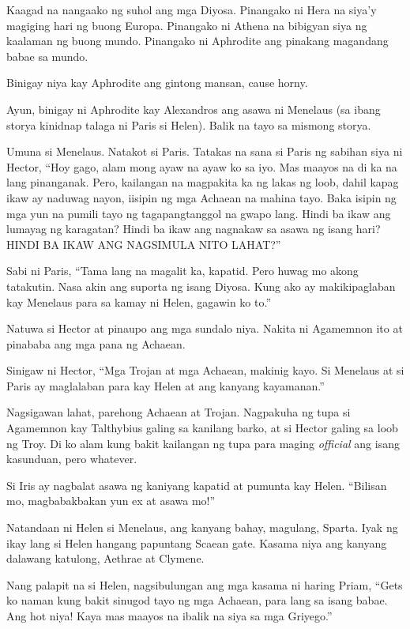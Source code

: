 \documentclass[12pt,letterpaper]{report}
\begin{document}
Kaagad na nangaako ng suhol ang mga Diyosa. Pinangako ni Hera na siya'y magiging hari ng buong Europa. Pinangako ni Athena na bibigyan siya ng kaalaman ng buong mundo. Pinangako ni Aphrodite ang pinakang magandang babae sa mundo.

Binigay niya kay Aphrodite ang gintong mansan, cause horny.

Ayun, binigay ni Aphrodite kay Alexandros ang asawa ni Menelaus (sa ibang storya kinidnap talaga ni Paris si Helen). Balik na tayo sa mismong storya.

Umuna si Menelaus. Natakot si Paris. Tatakas na sana si Paris ng sabihan siya ni Hector, ``Hoy gago, alam mong ayaw na ayaw ko sa iyo. Mas maayos na di ka na lang pinanganak. Pero, kailangan na magpakita ka ng lakas ng loob, dahil kapag ikaw ay naduwag nayon, iisipin ng mga Achaean na mahina tayo. Baka isipin ng mga yun na pumili tayo ng tagapangtanggol na gwapo lang. Hindi ba ikaw ang lumayag ng karagatan? Hindi ba ikaw ang nagnakaw sa asawa ng isang hari? HINDI BA IKAW ANG NAGSIMULA NITO LAHAT?''

Sabi ni Paris, ``Tama lang na magalit ka, kapatid. Pero huwag mo akong tatakutin. Nasa akin ang suporta ng isang Diyosa. Kung ako ay makikipaglaban kay Menelaus para sa kamay ni Helen, gagawin ko to.''

Natuwa si Hector at pinaupo ang mga sundalo niya. Nakita ni Agamemnon ito at pinababa ang mga pana ng Achaean.

Sinigaw ni Hector, ``Mga Trojan at mga Achaean, makinig kayo. Si Menelaus at si Paris ay maglalaban para kay Helen at ang kanyang kayamanan.''

Nagsigawan lahat, parehong Achaean at Trojan. Nagpakuha ng tupa si Agamemnon kay Talthybius galing sa kanilang barko, at si Hector galing sa loob ng Troy. Di ko alam kung bakit kailangan ng tupa para maging \textit{official} ang isang kasunduan, pero whatever.

Si Iris ay nagbalat asawa ng kaniyang kapatid at pumunta kay Helen. ``Bilisan mo, magbabakbakan yun ex at asawa mo!''

Natandaan ni Helen si Menelaus, ang kanyang bahay, magulang, Sparta. Iyak ng ikay lang si Helen hangang papuntang Scaean gate. Kasama niya ang kanyang dalawang katulong, Aethrae at Clymene.

Nang palapit na si Helen, nagsibulungan ang mga kasama ni haring Priam, ``Gets ko naman kung bakit sinugod tayo ng mga Achaean, para lang sa isang babae. Ang hot niya! Kaya mas maayos na ibalik na siya sa mga Griyego.''
\end{document}
